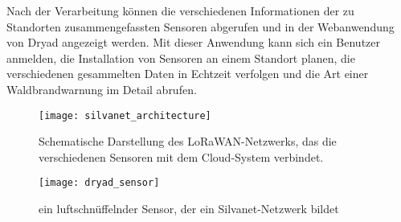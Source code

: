 Nach der Verarbeitung können die verschiedenen Informationen der zu Standorten zusammengefassten Sensoren abgerufen und in der Webanwendung von Dryad angezeigt werden.
Mit dieser Anwendung kann sich ein Benutzer anmelden, die Installation von Sensoren an einem Standort planen, die verschiedenen gesammelten Daten in Echtzeit verfolgen und die Art einer Waldbrandwarnung im Detail abrufen.

\begin{figure}[h]
  \centering
  \texttt{[image: silvanet\_architecture]}
  \caption{Schematische Darstellung des LoRaWAN-Netzwerks, das die verschiedenen Sensoren mit dem Cloud-System verbindet.}
\end{figure}


\begin{figure}[h]
  \centering
  \texttt{[image: dryad\_sensor]}
  \caption{ein luftschnüffelnder Sensor, der ein Silvanet-Netzwerk bildet}
\end{figure}
